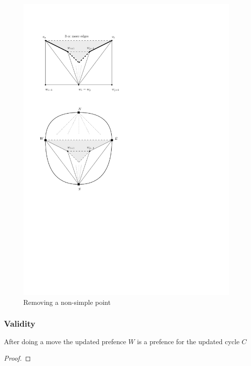     \begin{figure}[h!]
    \centering
    \includegraphics[scale=1]{redAlgo/img/removeNonSimplePoint}

    \caption{Removing a non-simple point
        \label{fig:removeNonSimplePoint}}
    \end{figure}

  \subsubsection{Validity}
    \label{ss:validity}

    \begin{lemma}
    After doing a move the updated prefence $W$ is a prefence for the updated cycle $C$
    \end{lemma}
    \begin{proof}
    \end{proof}

